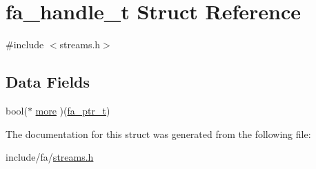 \hypertarget{structfa__handle__t}{\section{fa\-\_\-handle\-\_\-t Struct Reference}
\label{structfa__handle__t}
}


{\ttfamily \#include $<$streams.\-h$>$}

\subsection*{Data Fields}
\begin{DoxyCompactItemize}
\item 
bool($\ast$ \hyperlink{group___fa_gac1272da4c05b93e9ce5a2f3ba955637a}{more} )(\hyperlink{group___fa_ga915ddeae99ad7568b273d2b876425197}{fa\-\_\-ptr\-\_\-t})
\end{DoxyCompactItemize}


The documentation for this struct was generated from the following file\-:\begin{DoxyCompactItemize}
\item 
include/fa/\hyperlink{streams_8h}{streams.\-h}\end{DoxyCompactItemize}
